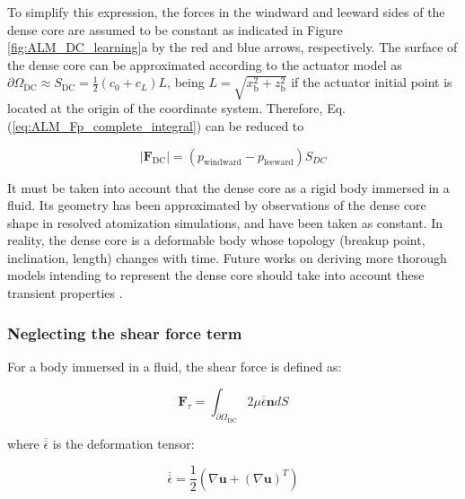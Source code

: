 To simplify this expression, the forces in the windward and leeward sides of the dense core are assumed to be constant as indicated in Figure \ref{fig:ALM_DC_learning}a by the red and blue arrows, respectively. The surface of the dense core can be approximated according to the actuator model as $\partial \Omega_\mathrm{DC} \approx S_\mathrm{DC} = \frac{1}{2} \left( c_0 + c_L \right) L$, being $L = \sqrt{x_\mathrm{b}^2+z_\mathrm{b}^2}$ if the actuator initial point is located at the origin of the coordinate system. Therefore, Eq. (\ref{eq:ALM_Fp_complete_integral}) can be reduced to


\begin{equation}
\label{eq:ALM_Fp_calculation_simplified}
\boxed{
|\boldsymbol{F}_\mathrm{DC}| = \left( p_\mathrm{windward} - p_\mathrm{leeward} \right) S_{DC} 
}
\end{equation}



It must be taken into account that the dense core as a rigid body immersed in a fluid. Its geometry has been approximated by observations of the dense core shape in resolved atomization simulations, and have been taken as constant. In reality, the dense core is a deformable body whose topology (breakup point, inclination, length) changes with time. Future works on deriving more thorough models intending to represent the dense core should take into account these transient properties .

\subsubsection*{Neglecting the shear force term}

For a body immersed in a fluid, the shear force is defined as:

\begin{equation}
\boldsymbol{F}_\tau = \int_{\partial \Omega_\mathrm{DC}} 2 \mu \overline{\overline{\epsilon}} \boldsymbol{n} dS
\end{equation}

where $\overline{\overline{\epsilon}}$ is the deformation tensor:

\begin{equation}
\overline{\overline{\epsilon}} = \frac{1}{2} \left( \nabla \boldsymbol{u} + \left(\nabla \boldsymbol{u}\right)^T \right)
\end{equation}

